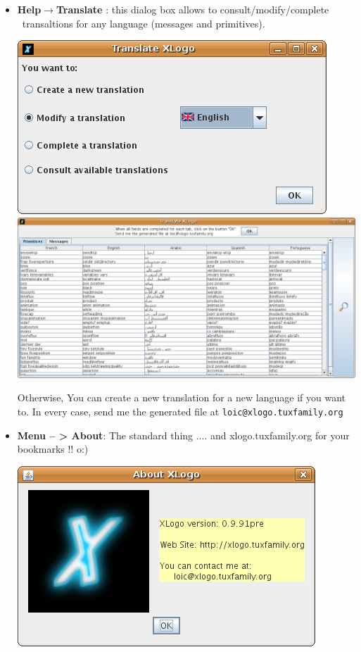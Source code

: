 \begin{itemize}
\item \textbf{Help$\to$Translate \xlogo}: this dialog box allows to consult/modify/complete \xlogo\ transaltions for any language (messages and primitives).\\
	\begin{center}
 		\includegraphics[scale=0.4]{pics/interface-CaptureXLogoTranslate1.png}
 		\includegraphics[scale=0.4]{pics/interface-CaptureXLogoTranslate2.png}
	\end{center}
	\vspace{0.25cm}
	Otherwise, You can create a new translation for a new language if you want to. In every case, send me the generated file at \texttt{loic@xlogo.tuxfamily.org}
\item \textbf{Menu -- > About}: The standard thing .... and xlogo.tuxfamily.org for your bookmarks !! o:) 
	\begin{center}
 		\includegraphics[scale=0.6]{pics/interface-CaptureAbout.png}
	\end{center}
	\vspace{0.25cm}
\end{itemize}
